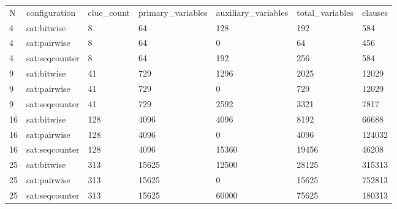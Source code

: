 \begin{tabular}{lllllll}
\hline
N & configuration & clue\_count & primary\_variables & auxiliary\_variables & total\_variables & clauses \\
4 & sat:bitwise & 8 & 64 & 128 & 192 & 584 \\
4 & sat:pairwise & 8 & 64 & 0 & 64 & 456 \\
4 & sat:seqcounter & 8 & 64 & 192 & 256 & 584 \\
9 & sat:bitwise & 41 & 729 & 1296 & 2025 & 12029 \\
9 & sat:pairwise & 41 & 729 & 0 & 729 & 12029 \\
9 & sat:seqcounter & 41 & 729 & 2592 & 3321 & 7817 \\
16 & sat:bitwise & 128 & 4096 & 4096 & 8192 & 66688 \\
16 & sat:pairwise & 128 & 4096 & 0 & 4096 & 124032 \\
16 & sat:seqcounter & 128 & 4096 & 15360 & 19456 & 46208 \\
25 & sat:bitwise & 313 & 15625 & 12500 & 28125 & 315313 \\
25 & sat:pairwise & 313 & 15625 & 0 & 15625 & 752813 \\
25 & sat:seqcounter & 313 & 15625 & 60000 & 75625 & 180313 \\
\hline
\end{tabular}
